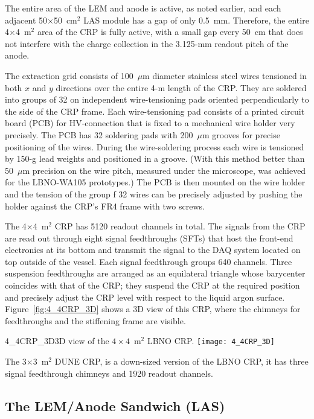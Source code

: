 The entire area of the LEM and anode is active, as noted earlier, and
each adjacent 50$\times$50~cm$^2$ LAS module has a gap of only 0.5~mm.
Therefore, the entire 4$\times$4~m$^2$ area of the CRP is fully
active, with a small gap every 50~cm that does not interfere with the
charge collection in the 3.125-mm readout pitch of the anode.

The extraction grid consists of 100~$\mu$m diameter stainless steel
wires tensioned in both $x$ and $y$ directions over the entire 4-m
length of the CRP. They are soldered into groups of 32 on independent
wire-tensioning pads oriented perpendicularly to the side of the CRP
frame.  Each wire-tensioning pad consists of a printed circuit board
(PCB) for HV-connection that is fixed to a mechanical wire holder very
precisely. The PCB has 32 soldering pads with 200~$\mu$m grooves for
precise positioning of the wires. During the wire-soldering process
each wire is tensioned by 150-g lead weights and positioned in a
groove.  (With this method better than 50~$\mu$m precision on the wire
pitch, measured under the microscope, was achieved for the LBNO-WA105
prototypes.) The PCB is then mounted on the wire holder and the
tension of the group f 32 wires can be precisely adjusted by pushing
the holder against the CRP's FR4 frame with two screws.


The 4$\times$4~m$^2$ CRP has 5120 readout channels in total. The
signals from the CRP are read out through eight signal feedthroughs
(SFTs) that host the front-end electronics at its bottom and transmit
the signal to the DAQ system located on top outside of the vessel.
Each signal feedthrough groups 640 channels. Three suspension
feedthroughs are arranged as an equilateral triangle whose barycenter
coincides with that of the CRP; they suspend the CRP at the required
position and precisely adjust the CRP level with respect to the liquid
argon surface. Figure~\ref{fig:4_4CRP_3D} shows a 3D view of this CRP,
where the chimneys for feedthroughs and the stiffening frame are
visible.
\begin{cdrfigure}{4_4CRP_3D}{3D view of the $4\times4$~m$^2$ LBNO CRP.}
\texttt{[image: 4\_4CRP\_3D]}  
\end{cdrfigure}

The 3$\times$3~m$^2$ DUNE CRP, is a down-sized version of the LBNO
CRP, it has three signal feedthrough chimneys and 1920 readout
channels.


\subsection{The LEM/Anode Sandwich (LAS)}


